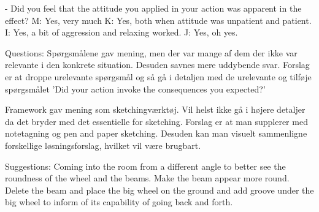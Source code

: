     - Did you feel that the attitude you applied in your action was apparent in the effect?
    M: Yes, very much
    K: Yes, both when attitude was unpatient and patient.
    I: Yes, a bit of aggression and relaxing worked.
    J: Yes, oh yes.


 Questions:
 Spørgsmålene gav mening, men der var mange af dem der ikke var relevante i den konkrete situation. Desuden savnes mere uddybende svar. Forslag er at droppe urelevante spørgsmål og så gå i detaljen med de urelevante og tilføje spørgsmålet 'Did your action invoke the consequences you expected?'

 Framework gav mening som sketchingværktøj. Vil helst ikke gå i højere detaljer da det bryder med det essentielle for sketching. Forslag er at man supplerer med notetagning og pen and paper sketching. Desuden kan man visuelt sammenligne forskellige løsningsforslag, hvilket vil være brugbart.

 Suggestions:
 Coming into the room from a different angle to better see the roundness of the wheel and the beams.
 Make the beam appear more round.
 Delete the beam and place the big wheel on the ground and add groove under the big wheel to inform of its capability of going back and forth.
